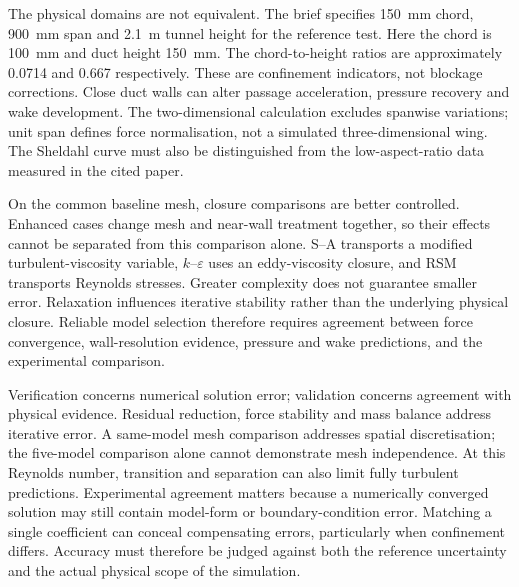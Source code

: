 \documentclass[conf]{new-aiaa}
\newcommand{\caseKE}{\ensuremath{k\!\text{--}\!\varepsilon}}
\begin{document}
The physical domains are not equivalent. The brief specifies \SI{150}{\milli\metre} chord, \SI{900}{\milli\metre} span and \SI{2.1}{\metre} tunnel height for the reference test. Here the chord is \SI{100}{\milli\metre} and duct height \SI{150}{\milli\metre}. The chord-to-height ratios are approximately 0.0714 and 0.667 respectively. These are confinement indicators, not blockage corrections. Close duct walls can alter passage acceleration, pressure recovery and wake development. The two-dimensional calculation excludes spanwise variations; unit span defines force normalisation, not a simulated three-dimensional wing. The Sheldahl curve must also be distinguished from the low-aspect-ratio data measured in the cited paper.

On the common baseline mesh, closure comparisons are better controlled. Enhanced cases change mesh and near-wall treatment together, so their effects cannot be separated from this comparison alone. S--A transports a modified turbulent-viscosity variable, \caseKE{} uses an eddy-viscosity closure, and RSM transports Reynolds stresses. Greater complexity does not guarantee smaller error. Relaxation influences iterative stability rather than the underlying physical closure. Reliable model selection therefore requires agreement between force convergence, wall-resolution evidence, pressure and wake predictions, and the experimental comparison.

Verification concerns numerical solution error; validation concerns agreement with physical evidence. Residual reduction, force stability and mass balance address iterative error. A same-model mesh comparison addresses spatial discretisation; the five-model comparison alone cannot demonstrate mesh independence. At this Reynolds number, transition and separation can also limit fully turbulent predictions. Experimental agreement matters because a numerically converged solution may still contain model-form or boundary-condition error. Matching a single coefficient can conceal compensating errors, particularly when confinement differs. Accuracy must therefore be judged against both the reference uncertainty and the actual physical scope of the simulation.
\end{document}
